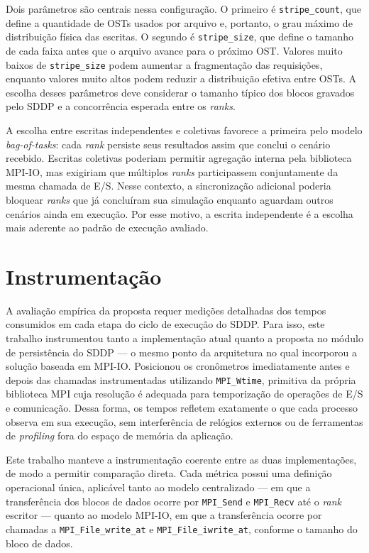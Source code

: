 Dois parâmetros são centrais nessa configuração. O primeiro é
\texttt{stripe\_count}, que define a quantidade de OSTs usados por arquivo
e, portanto, o grau máximo de distribuição física das escritas. O segundo
é \texttt{stripe\_size}, que define o tamanho de cada faixa antes que o
arquivo avance para o próximo OST. Valores muito baixos de
\texttt{stripe\_size} podem aumentar a fragmentação das requisições,
enquanto valores muito altos podem reduzir a distribuição efetiva entre
OSTs. A escolha desses parâmetros deve considerar o tamanho típico dos
blocos gravados pelo SDDP e a concorrência esperada entre os
\textit{ranks}.

A escolha entre escritas independentes e coletivas favorece a primeira
pelo modelo \textit{bag-of-tasks}: cada \textit{rank} persiste seus
resultados assim que conclui o cenário recebido. Escritas
coletivas poderiam permitir agregação interna pela biblioteca MPI-IO, mas
exigiriam que múltiplos \textit{ranks} participassem conjuntamente da
mesma chamada de E/S. Nesse contexto, a sincronização adicional poderia
bloquear \textit{ranks} que já concluíram sua simulação enquanto aguardam
outros cenários ainda em execução. Por esse motivo, a escrita
independente é a escolha mais aderente ao padrão de execução avaliado.

\section{Instrumentação}
\label{sec:instrumentacao}

A avaliação empírica da proposta requer medições detalhadas dos tempos consumidos em cada etapa do ciclo de
execução do SDDP. Para isso, este trabalho instrumentou tanto a
implementação atual quanto a proposta no módulo de persistência
do SDDP --- o mesmo ponto da arquitetura no qual incorporou a solução
baseada em MPI-IO. Posicionou os cronômetros imediatamente antes e depois
das chamadas instrumentadas utilizando \texttt{MPI\_Wtime}, primitiva da
própria biblioteca MPI cuja
resolução é adequada para temporização de operações de E/S e
comunicação. Dessa forma, os tempos refletem exatamente o que cada
processo observa em sua execução, sem interferência de relógios externos
ou de ferramentas de \textit{profiling} fora do espaço de memória da
aplicação.

Este trabalho manteve a instrumentação coerente entre as duas
implementações, de modo a permitir comparação direta. Cada métrica possui uma definição
operacional única, aplicável tanto ao modelo centralizado --- em que a
transferência dos blocos de dados ocorre por \texttt{MPI\_Send} e
\texttt{MPI\_Recv} até o \textit{rank} escritor --- quanto ao modelo
MPI-IO, em que a transferência ocorre por chamadas a
\texttt{MPI\_File\_write\_at} e \texttt{MPI\_File\_iwrite\_at}, conforme
o tamanho do bloco de dados.


